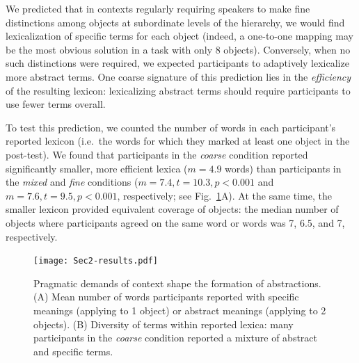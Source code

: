 We predicted that in contexts regularly requiring speakers to make fine distinctions among objects at subordinate levels of the hierarchy, we would find lexicalization of specific terms for each object (indeed, a one-to-one mapping may be the most obvious solution in a task with only 8 objects). Conversely, when no such distinctions were required, we expected participants to adaptively lexicalize more abstract terms. One coarse signature of this prediction lies in the \emph{efficiency} of the resulting lexicon: lexicalizing abstract terms should require participants to use fewer terms overall.

To test this prediction, we counted the number of words in each participant's reported lexicon (i.e.\ the words for which they marked at least one object in the post-test). We found that participants in the \emph{coarse} condition reported significantly smaller, more efficient lexica ($m = 4.9$ words) than participants in the \emph{mixed} and \emph{fine} conditions ($m = 7.4, t = 10.3, p <0.001$ and $m = 7.6, t = 9.5, p < 0.001$, respectively; see Fig.\ \ref{fig:lexiconContent}A). At the same time, the smaller lexicon provided equivalent coverage of objects: the median number of objects where participants agreed on the same word or words was 7, 6.5, and 7, respectively. 

\begin{figure}[t]
\begin{center}
\texttt{[image: Sec2-results.pdf]}
\caption{Pragmatic demands of context shape the formation of abstractions. (A) Mean number of words participants reported with specific meanings (applying to 1 object) or abstract meanings (applying to 2 objects). (B) Diversity of terms within reported lexica: many participants in the \emph{coarse} condition reported a mixture of abstract and specific terms.}
\label{fig:lexiconContent}
\end{center}
\end{figure}

